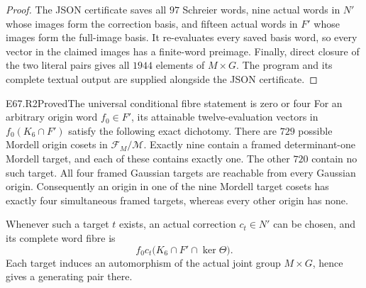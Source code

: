 \begin{proof}
The JSON certificate saves all $97$ Schreier words, nine actual
words in $N'$ whose images form the correction basis, and fifteen
actual words in $F'$ whose images form the full-image basis.
It re-evaluates every saved basis word, so every vector in the
claimed images has a finite-word preimage. Finally, direct closure
of the two literal pairs gives all $1944$ elements of $M\times G$.
The program and its complete textual output are supplied alongside
the JSON certificate.
\end{proof}

\begin{statement}{E67.R2}{Proved}{The universal conditional fibre statement is zero or four}
For an arbitrary origin word $f_0\in F'$, its attainable
twelve-evaluation vectors in $f_0(K_6\cap F')$ satisfy the following
exact dichotomy. There are $729$ possible Mordell origin cosets in
$\mathcal F_M/\mathcal M$. Exactly nine contain a framed
determinant-one Mordell target, and each of these contains exactly
one. The other $720$ contain no such target. All four framed
Gaussian targets are reachable from every Gaussian origin.
Consequently an origin in one of the nine Mordell target cosets
has exactly four simultaneous framed targets, whereas every
other origin has none.

Whenever such a target $t$ exists, an actual correction
$c_t\in N'$ can be chosen, and its complete word fibre is
\[
 f_0c_t\bigl(K_6\cap F'\cap\ker\Theta\bigr).                  \tag{ER2}
\]
Each target induces an automorphism of the actual joint group
$M\times G$, hence gives a generating pair there.
\end{statement}

